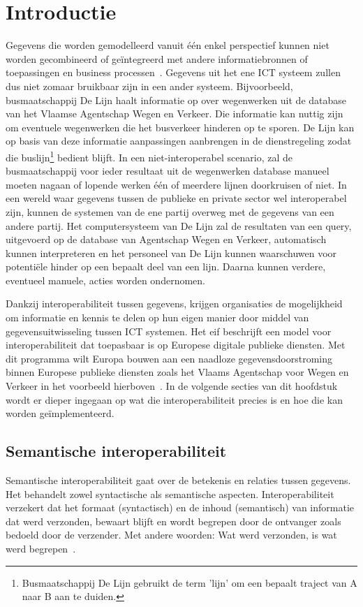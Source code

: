 \chapter{Introductie}
\label{chap:interoperabele_gegevens}
Gegevens die worden gemodelleerd vanuit één enkel perspectief kunnen niet worden gecombineerd of geïntegreerd met andere informatiebronnen of toepassingen en business processen~\cite{interoperability}. Gegevens uit het ene ICT systeem zullen dus niet zomaar bruikbaar zijn in een ander systeem. Bijvoorbeeld, busmaatschappij De Lijn haalt informatie op over wegenwerken uit de database van het Vlaamse Agentschap Wegen en Verkeer. Die informatie kan nuttig zijn om eventuele wegenwerken die het busverkeer hinderen op te sporen. De Lijn kan op basis van deze informatie aanpassingen aanbrengen in de dienstregeling zodat die buslijn\footnote{Busmaatschappij De Lijn gebruikt de term 'lijn' om een bepaalt traject van A naar B aan te duiden.} bedient blijft. In een niet-interoperabel scenario, zal de busmaatschappij voor ieder resultaat uit de wegenwerken database manueel moeten nagaan of lopende werken één of meerdere lijnen doorkruisen of niet. In een wereld waar gegevens tussen de publieke en private sector wel interoperabel zijn, kunnen de systemen van de ene partij overweg met de gegevens van een andere partij. Het computersysteem van De Lijn zal de resultaten van een query, uitgevoerd op de database van Agentschap Wegen en Verkeer, automatisch kunnen interpreteren en het personeel van De Lijn kunnen waarschuwen voor potentiële hinder op een bepaalt deel van een lijn. Daarna kunnen verdere, eventueel manuele, acties worden ondernomen.

Dankzij interoperabiliteit tussen gegevens, krijgen organisaties de mogelijkheid om informatie en kennis te delen op hun eigen manier door middel van gegevensuitwisseling tussen ICT systemen. Het \acrfull{eif} beschrijft een model voor interoperabiliteit dat toepasbaar is op Europese digitale publieke diensten. Met dit programma wilt Europa bouwen aan een naadloze gegevensdoorstroming binnen Europese publieke diensten zoals het Vlaams Agentschap voor Wegen en Verkeer in het voorbeeld hierboven~\cite{neweif}. In de volgende secties van dit hoofdstuk wordt er dieper ingegaan op wat die interoperabiliteit precies is en hoe die kan worden geïmplementeerd.

\section{Semantische interoperabiliteit}
\label{sec:semantische_interoperabiliteit}
Semantische interoperabiliteit gaat over de betekenis en relaties tussen gegevens. Het behandelt zowel syntactische als semantische aspecten. Interoperabiliteit verzekert dat het formaat (syntactisch) en de inhoud (semantisch) van informatie dat werd verzonden, bewaart blijft en wordt begrepen door de ontvanger zoals bedoeld door de verzender. Met andere woorden: Wat werd verzonden, is wat werd begrepen~\cite{neweif}.

